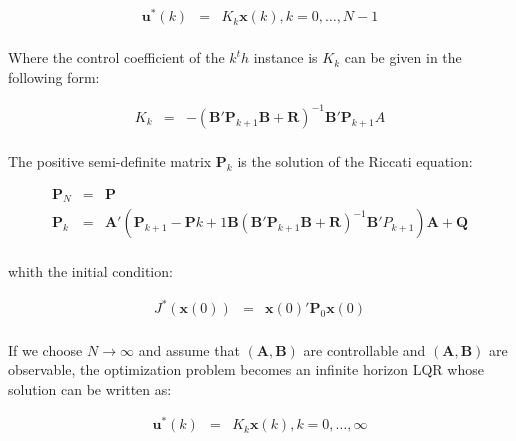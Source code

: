 		\begin{equation}
        \begin{array}{rcl}
         \textbf{u}^*(k)&=&K_k\textbf{x}(k), k=0,\dots,N-1\\
        \end{array}
        \label{BASICMPC:equ:control_law}
    \end{equation}
		
		Where the control coefficient of the $k^th$ instance is $K_k$ can be given in the following form:
		
		\begin{equation}
        \begin{array}{rcl}
         K_k&=&-(\textbf{B}'\textbf{P}_{k+1}\textbf{B}+\textbf{R})^{-1}\textbf{B}'\textbf{P}_{k+1}A\\
        \end{array}
        \label{BASICMPC:equ:control_coefficient}
    \end{equation}
		
		The positive semi-definite matrix $\textbf{P}_k$ is the solution of the Riccati equation:
		
		\begin{equation}
        \begin{array}{rcl}
        \textbf{P}_N&=&\textbf{P}\\
				\textbf{P}_k&=&\textbf{A}'(\textbf{P}_{k+1}-\textbf{P}{k+1}\textbf{B}(\textbf{B}'\textbf{P}_{k+1}\textbf{B}+\textbf{R})^{-1}\textbf{B}'P_{k+1})\textbf{A}+\textbf{Q}\\
        \end{array}
        \label{BASICMPC:equ:Riccati}
    \end{equation}
		
		whith the initial condition:
		
		\begin{equation}
        \begin{array}{rcl}
				J^*(\textbf{x}(0))&=&\textbf{x}(0)'\textbf{P}_0\textbf{x}(0)\\
        \end{array}
        \label{BASICMPC:equ:Riccati_initial}
    \end{equation}
		
		If we choose $N\longrightarrow\infty$ and assume that $(\textbf{A},\textbf{B})$ are controllable and $(\textbf{A},\textbf{B})$ are observable, the optimization problem becomes an infinite horizon LQR whose solution can be written as:
		
		\begin{equation}
        \begin{array}{rcl}
         \textbf{u}^*(k)&=&K_k\textbf{x}(k), k=0,\dots,\infty\\
        \end{array}
        \label{BASICMPC:equ:control_law_infinite}
    \end{equation}
		
